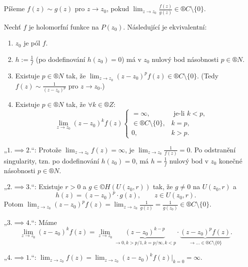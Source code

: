 \documentclass[12pt]{article}					%
\begin{document}
\begin{poznamka}
	Píšeme $f(z)\sim g(z)$ pro $z \rightarrow z_0$, pokud $\lim_{z \rightarrow z_0} \frac{f(z)}{g(z)} \in ®C \setminus \{0\}$.
\end{poznamka}

\begin{veta}[O póle]
	Nechť $f$ je holomorfní funkce na $P(z_0)$. Následující je ekvivalentní:
	
	\begin{enumerate}
		\item $z_0$ je pól $f$.
		\item $h := \frac{1}{f}$ (po dodefinování $h(z_0) = 0$) má v $z_0$ nulový bod násobnosti $p \in ®N$.
		\item Existuje $p \in ®N$ tak, že $\lim_{z \rightarrow z_0}(z - z_0)^p f(z) \in ®C \setminus \{0\}$. (Tedy $f(z) \sim \frac{1}{(z - z_0)^p}$ pro $z \rightarrow z_0$.)
		\item Existuje $p \in ®N$ tak, že $\forall k \in ®Z$:
			$$ \lim_{z \rightarrow z_0} (z - z_0)^k f(z) \begin{cases} = ∞, & \text{ je-li } k < p,\\ \in ®C \setminus \{0\}, & k=p, \\ 0, & k > p.\end{cases} $$
	\end{enumerate}

	\begin{dukazin}
		„$1. \implies 2.$“: Protože $\lim_{z \rightarrow z_0} f(z) = ∞$, je $\lim_{z \rightarrow z_0} \frac{1}{f(z)} = 0$. Po odstranění singularity, tzn. po dodefinování $h(z_0) = 0$, má $h = \frac{1}{f}$ nulový bod v $z_0$ konečné násobnosti $p \in ®N$.

		„$2. \implies 3.$“: Existuje $r > 0$ a $g \in ©H(U(z_0, r))$ tak, že $g ≠ 0$ na $U(z_0, r)$ a
		$$ h(z) = (z - z_0)^p·g(z), \qquad z \in U(z_0, r). $$
		Potom $\lim_{z \rightarrow z_0} (z - z_0)^p f(z) = \lim_{z \rightarrow z_0} \frac{1}{g(z)} = \frac{1}{g(z_0)} \in ®C \setminus \{0\}$.

		„$3. \implies 4.$“: Máme
		$$ \lim_{z \rightarrow z_0} (z - z_0)^k f(z) = \lim_{z \rightarrow z_0} \underbrace{(z - z_0)^{k - p}}_{\rightarrow 0, k > p / 1, k=p / ∞, k < p}·\underbrace{(z - z_0)^p f(z)}_{\rightarrow … \in ®C \setminus \{0\}}. $$

		„$4. \implies 1.$“: $\lim_{z \rightarrow z_0} f(z) = \lim_{z \rightarrow z_0} (z - z_0)^k f(z) |_{k=0} = ∞$.
	\end{dukazin}
\end{veta}
\end{document}
